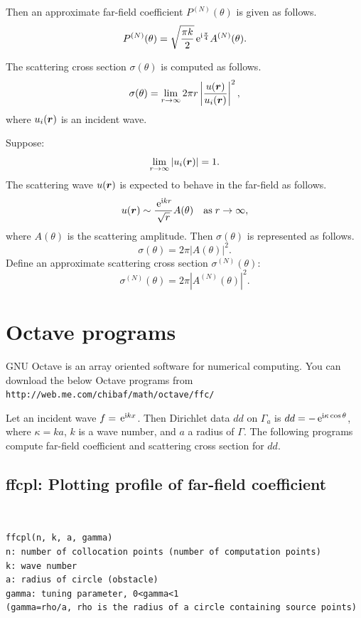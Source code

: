 \documentclass[12pt]{article}
\def\e{ \,{\rm e}}
\def\bfvec#1{\mbox{\boldmath$#1$}}
\begin{document}
Then an approximate far-field coefficient\cite{Bowman-Senior-Uslenghi} $P^{(N)}(\theta)$ is given as follows.
\begin{displaymath}
P^{(N)}(\theta)=\sqrt{\frac{\pi k}{2}}\e^{\mathrm{i}\frac{\pi}{4}} A^{(N)}(\theta).
\end{displaymath}

The scattering cross section $\sigma(\theta)$ is computed as follows\cite{Bowman-Senior-Uslenghi}.
\begin{displaymath}
\sigma(\theta)=\lim_{r\rightarrow\infty}2\pi r \left|\frac{u(\bfvec{r})}{u_i(\bfvec{r})}\right|^2,
\end{displaymath}
where $u_i(\bfvec{r})$ is an incident wave.

Suppose:
\begin{displaymath}
\lim_{r\rightarrow\infty}|u_i(\bfvec{r})|=1.
\end{displaymath}
The scattering wave $u(\bfvec{r})$ is expected to behave in the far-field as follows.
\begin{displaymath}
u(\bfvec{r}) \sim \frac{\e^{\mathrm{i}kr}}{\sqrt{r}}A(\theta) \quad {\rm as}\;r\rightarrow\infty,
\end{displaymath}
where $A(\theta)$ is the scattering amplitude.
Then $\sigma(\theta)$ is represented as follows.
\begin{displaymath}
\sigma(\theta)=2\pi |A(\theta)|^2.
\end{displaymath}
Define an approximate scattering cross section $\sigma^{(N)}(\theta)$:
\begin{displaymath}
\sigma^{(N)}(\theta)=2\pi |A^{(N)}(\theta)|^2.
\end{displaymath}


\section{Octave programs}
GNU Octave is an array oriented software for numerical computing\cite{eaton}. 
You can download the below Octave programs from {\tt http://web.me.com/chibaf/math/octave/ffc/ }

Let an incident wave $f=\e^{\mathrm{i}kx}$. Then Dirichlet data $dd$ on $\Gamma_a$ is $dd=-\e^{\mathrm{i}\kappa\cos\theta}$, where $\kappa=k a$, $k$ is a wave number, and $a$ a radius of $\Gamma$.
The following programs compute far-field coefficient and scattering cross section for $dd$.

\subsection{ffcpl: Plotting profile of far-field coefficient}
{\tt
\begin{verbatim}
ffcpl(n, k, a, gamma)
n: number of collocation points (number of computation points)
k: wave number
a: radius of circle (obstacle)
gamma: tuning parameter, 0<gamma<1
(gamma=rho/a, rho is the radius of a circle containing source points)
\end{verbatim}
}
\end{document}
